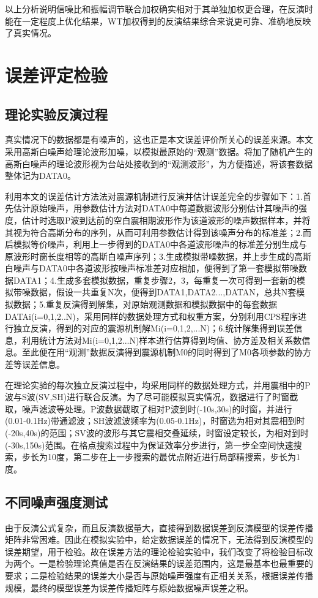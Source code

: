 以上分析说明信噪比和振幅调节联合加权确实相对于其单独加权更合理，在反演时能在一定程度上优化结果，WT加权得到的反演结果综合来说更可靠、准确地反映了真实情况。

\section{误差评定检验}

\subsection{理论实验反演过程}
真实情况下的数据都是有噪声的，这也正是本文误差评价所关心的误差来源。本文采用高斯白噪声给理论波形加噪，以模拟最原始的“观测”数据。将加了随机产生的高斯白噪声的理论波形视为台站处接收到的“观测波形”，为方便描述，将该套数据整体记为DATA0。

利用本文的误差估计方法法对震源机制进行反演并估计误差完全的步骤如下：1.首先估计原始噪声，用参数估计方法对DATA0中每道数据波形分别估计其噪声的强度，估计时选取P波到达前的空白震相期波形作为该道波形的噪声数据样本，并将其视为符合高斯分布的序列，从而可利用参数估计得到该噪声分布的标准差；2.而后模拟等价噪声，利用上一步得到的DATA0中各道波形噪声的标准差分别生成与原波形时窗长度相等的高斯白噪声序列；3.生成模拟带噪数据，并上步生成的高斯白噪声与DATA0中各道波形按噪声标准差对应相加，便得到了第一套模拟带噪数据DATA1；4.生成多套模拟数据，重复步骤2，3，每重复一次可得到一套新的模拟带噪数据，假设一共重复N次，便得到DATA1,DATA2...,DATAN，总共N套模拟数据；5.重复反演得到解集，对原始观测数据和模拟数据中的每套数据DATAi(i=0,1,2..N)，采用同样的数据处理方式和权重方案，分别利用CPS程序进行独立反演，得到的对应的震源机制解Mi(i=0,1,2,...N)；6.统计解集得到误差信息，利用统计方法对Mi(i=0,1,2...N)样本进行估算得到均值、协方差及相关系数信息。至此便在用“观测”数据反演得到震源机制M0的同时得到了M0各项参数的协方差等误差信息。

在理论实验的每次独立反演过程中，均采用同样的数据处理方式，并用震相中的P波与S波(SV,SH)进行联合反演。为了尽可能模拟真实情况，数据进行了时窗截取，噪声滤波等处理。P波数据截取了相对P波到时(-10s,30s)的时窗，并进行(0.01-0.1Hz)带通滤波；SH波滤波频率为(0.05-0.1Hz)，时窗选为相对其震相到时(-20s,40s)的范围；SV波的波形与其它震相交叠延续，时窗设定较长，为相对到时(-30s,150s)范围。在格点搜索过程中为保证效率分步进行，第一步全空间快速搜索，步长为10度，第二步在上一步搜索的最优点附近进行局部精搜索，步长为1度。

\subsection{不同噪声强度测试}
由于反演公式复杂，而且反演数据量大，直接得到数据误差到反演模型的误差传播矩阵非常困难。因此在模拟实验中，给定数据误差的情况下，无法得到反演模型的误差期望，用于检验。故在误差方法的理论检验实验中，我们改变了将检验目标改为两个。一是检验理论真值是否在反演结果的误差范围内，这是最基本也最重要的要求；二是检验结果的误差大小是否与原始噪声强度有正相关关系，根据误差传播规模，最终的模型误差为误差传播矩阵与原始数据噪声误差之积。


